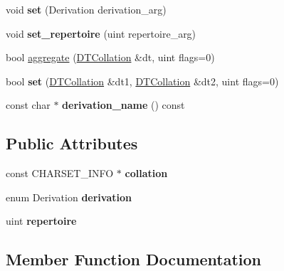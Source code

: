 \begin{DoxyCompactItemize}
void {\bfseries set} (Derivation derivation\+\_\+arg)
\item 
\mbox{\label{classDTCollation_a77f76f3005c7164c040d2a7943c0b115}} 
void {\bfseries set\+\_\+repertoire} (uint repertoire\+\_\+arg)
\item 
bool \mbox{\hyperlink{classDTCollation_a2454fdfe7620beabe738ff9cf60ac609}{aggregate}} (\mbox{\hyperlink{classDTCollation}{D\+T\+Collation}} \&dt, uint flags=0)
\item 
\mbox{\label{classDTCollation_a673f2b7cb2cbf3fcba163faf1c31bb16}} 
bool {\bfseries set} (\mbox{\hyperlink{classDTCollation}{D\+T\+Collation}} \&dt1, \mbox{\hyperlink{classDTCollation}{D\+T\+Collation}} \&dt2, uint flags=0)
\item 
\mbox{\label{classDTCollation_a8b72aa4bb53ca972f58f214b9e2418a4}} 
const char $\ast$ {\bfseries derivation\+\_\+name} () const
\end{DoxyCompactItemize}
\subsection*{Public Attributes}
\begin{DoxyCompactItemize}
\item 
\mbox{\label{classDTCollation_a8754deca48493f23eed469cfecc12c01}} 
const C\+H\+A\+R\+S\+E\+T\+\_\+\+I\+N\+FO $\ast$ {\bfseries collation}
\item 
\mbox{\label{classDTCollation_a099591f9481509743313a8ed31aa3086}} 
enum Derivation {\bfseries derivation}
\item 
\mbox{\label{classDTCollation_acfbb737150cc7186567dddaca8c15ee1}} 
uint {\bfseries repertoire}
\end{DoxyCompactItemize}


\subsection{Member Function Documentation}
\mbox{\label{classDTCollation_a2454fdfe7620beabe738ff9cf60ac609}} 
